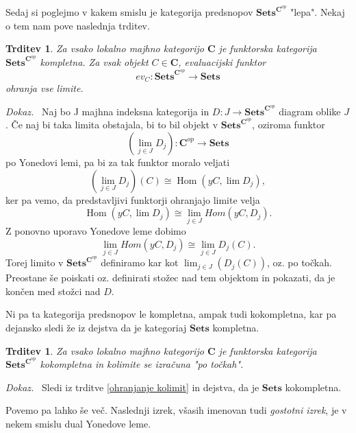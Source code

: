 \documentclass[12pt,a4paper]{book}
\theoremstyle{definition}
\theoremstyle{plain}
\newtheorem{trditev}[definicija]{Trditev}
\newenvironment{dokaz}{\emph{Dokaz.}\ }{\hspace{\fill}{$\Box$}}
\theoremstyle{definition}
\theoremstyle{remark}
\newcommand{\cat}[1]{\textbf{#1}}
\DeclareMathOperator{\Hom}{Hom}
\newcommand{\predsnop}[1]{\cat{Sets}^{\cat{#1}^{op}}}
\begin{document}
Sedaj si poglejmo v kakem smislu je kategorija predsnopov $\predsnop{C}$ "lepa". Nekaj o tem nam pove naslednja trditev.

\begin{trditev}
Za vsako lokalno majhno kategorijo $\cat{C}$ je funktorska kategorija $\predsnop{C}$ kompletna. Za vsak objekt $C \in \cat{C}$, evaluacijski funktor 
$$ev_C : \predsnop{C} \to \cat{Sets}$$
ohranja vse limite.
\end{trditev}
\begin{dokaz}
Naj bo J majhna indeksna kategorija in $D : J \to \cat{Sets}^{\cat{C}^{op}}$ diagram oblike $J$. Če naj bi taka limita obstajala, bi to bil objekt v $\cat{Sets}^{\cat{C}^{op}}$, oziroma funktor 
$$(\lim_{j \in J} D_j): \cat{C}^{op} \to \cat{Sets}$$
po Yonedovi lemi, pa bi za tak funktor moralo veljati
$$(\lim_{j \in J} D_j)(C) \cong \Hom(yC, \lim D_j),$$
ker pa vemo, da predstavljivi funktorji ohranjajo limite velja
$$\Hom(yC, \lim D_j) \cong \lim_{j \in J} Hom(yC, D_j).$$
Z ponovno uporavo Yonedove leme dobimo
$$\lim_{j \in J} Hom(yC, D_j) \cong \lim_{j \in J} D_j(C).$$
Torej limito v $\predsnop{C}$ definiramo kar kot $\lim_{j \in J} (D_j(C))$, oz. po točkah.
Preostane še poiskati oz. definirati stožec nad tem objektom in pokazati, da je končen med stožci nad $D$.



\end{dokaz}

Ni pa ta kategorija predsnopov le kompletna, ampak tudi kokompletna, kar pa dejansko sledi že iz dejstva da je kategoriaj $\cat{Sets}$ kompletna.

\begin{trditev}
Za vsako lokalno majhno kategorijo $\cat{C}$ je funktorska kategorija $\predsnop{C}$ kokompletna in kolimite se izračuna "po točkah".
\end{trditev}
\begin{dokaz}
Sledi iz trditve \ref{ohranjanje kolimit} in dejstva, da je $\cat{Sets}$ kokompletna.
\end{dokaz}

Povemo pa lahko še več. Naslednji izrek, všasih imenovan tudi \emph{gostotni izrek}, je v nekem smislu dual Yonedove leme.
\end{document}
